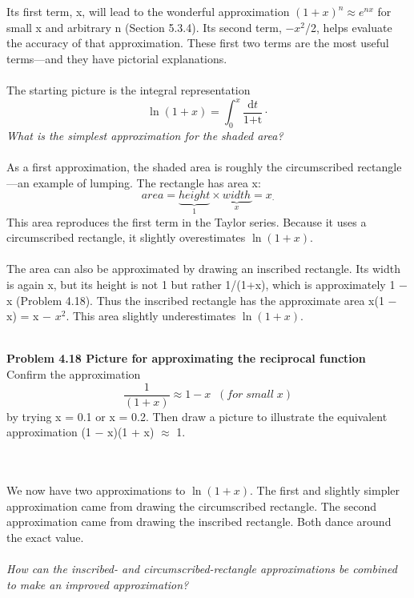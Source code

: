 \documentclass{book}
\newcounter{pro1}
\begin{document}
\noindent\Large \textrm{Its first term, x, will lead to the wonderful approximation $(1+x)^{n}\approx e^{nx}$ for small x and arbitrary n (Section 5.3.4). Its second term, −$x^{2}$/2, helps
evaluate the accuracy of that approximation. These first two terms are
the most useful terms—and they have pictorial explanations.}\\
\\
\Large \textrm{The starting picture is the integral representation}\\
\begin {equation}\label{formula4.30}
\ln{(1+x)}=\int_{0}^{x}\frac{\text{d}t}{\text{1+t}}\cdot
\end{equation}
\large \textsl{What is the simplest approximation for the shaded area?}\\
\\
\Large \textrm{As a first approximation, the shaded area is roughly
the circumscribed rectangle—an example of lumping.
The rectangle has area x:}\\
\begin {equation}\label{formula4.31}
area=\underbrace{height}_{1}\times\underbrace{width}_{x}=x_\cdot
\end{equation}
\Large \textrm{This area reproduces the first term in the Taylor series. Because it uses a
circumscribed rectangle, it slightly overestimates $\ln{(1+x)}$.}\\
\\
\Large \textrm{The area can also be approximated by drawing an inscribed
rectangle. Its width is again x, but its height
is not 1 but rather 1/(1+x), which is approximately
1 − x (Problem 4.18). Thus the inscribed rectangle
has the approximate area x(1 − x) = x − $x^{2}$. This
area slightly underestimates $\ln{(1+x)}$.}\\
\\
\colorbox{light-gray}{
\begin{minipage}{\textwidth}
\Large \textrm{\textbf{Problem 4.18 \;  Picture for approximating the reciprocal function}\\
Confirm the approximation}
\begin {equation}\label{formula4.32}
\frac{1}{(1+x)}\approx 1-x \;\; (for\;small\;x)
\end{equation}
by trying x = 0.1 or x = 0.2. Then draw a picture to illustrate the equivalent
approximation (1 − x)(1 + x) $\approx $ 1.
\end{minipage}}\\
\\
\Large \textrm{We now have two approximations to $\ln{(1+x)}$. The first and slightly
simpler approximation came from drawing the circumscribed rectangle.
The second approximation came from drawing the inscribed rectangle.
Both dance around the exact value.}\\
\\
\large \textsl{How can the inscribed- and circumscribed-rectangle approximations be combined
to make an improved approximation?}\\
\\
\newpage
\fancyhf{}
\end{document}

